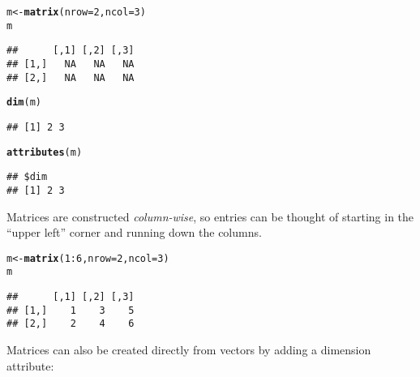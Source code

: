 \documentclass[10pt,a4paper,twoside]{article}\usepackage[]{graphicx}\usepackage[]{xcolor}
\makeatletter
\newcommand{\hlnum}[1]{\textcolor[rgb]{0.686,0.059,0.569}{#1}}%
\newcommand{\hlopt}[1]{\textcolor[rgb]{0,0,0}{#1}}%
\newcommand{\hldef}[1]{\textcolor[rgb]{0.345,0.345,0.345}{#1}}%
\newcommand{\hlkwb}[1]{\textcolor[rgb]{0.69,0.353,0.396}{#1}}%
\newcommand{\hlkwc}[1]{\textcolor[rgb]{0.333,0.667,0.333}{#1}}%
\newcommand{\hlkwd}[1]{\textcolor[rgb]{0.737,0.353,0.396}{\textbf{#1}}}%
\newenvironment{kframe}{%
 \def\at@end@of@kframe{}%
 \ifinner\ifhmode%
  \def\at@end@of@kframe{\end{minipage}}%
  \begin{minipage}{\columnwidth}%
 \fi\fi%
 \def\FrameCommand##1{\hskip\@totalleftmargin \hskip-\fboxsep
 \colorbox{shadecolor}{##1}\hskip-\fboxsep
     \hskip-\linewidth \hskip-\@totalleftmargin \hskip\columnwidth}%
 \MakeFramed {\advance\hsize-\width
   \@totalleftmargin\z@ \linewidth\hsize
   \@setminipage}}%
 {\par\unskip\endMakeFramed%
 \at@end@of@kframe}
\newenvironment{knitrout}{}{} %
\makeatother
\begin{document}
\begin{knitrout}
\color{fgcolor}\begin{kframe}
\begin{alltt}
\hldef{m} \hlkwb{<-} \hlkwd{matrix}\hldef{(}\hlkwc{nrow} \hldef{=} \hlnum{2}\hldef{,} \hlkwc{ncol} \hldef{=} \hlnum{3}\hldef{)}
\hldef{m}
\end{alltt}
\begin{verbatim}
##      [,1] [,2] [,3]
## [1,]   NA   NA   NA
## [2,]   NA   NA   NA
\end{verbatim}
\begin{alltt}
\hlkwd{dim}\hldef{(m)}
\end{alltt}
\begin{verbatim}
## [1] 2 3
\end{verbatim}
\begin{alltt}
\hlkwd{attributes}\hldef{(m)}
\end{alltt}
\begin{verbatim}
## $dim
## [1] 2 3
\end{verbatim}
\end{kframe}
\end{knitrout}

Matrices are constructed \emph{column-wise}, so entries can be thought of starting in the ``upper left'' corner and running down the columns.

\begin{knitrout}
\color{fgcolor}\begin{kframe}
\begin{alltt}
\hldef{m} \hlkwb{<-} \hlkwd{matrix}\hldef{(}\hlnum{1}\hlopt{:}\hlnum{6}\hldef{,} \hlkwc{nrow} \hldef{=} \hlnum{2}\hldef{,} \hlkwc{ncol} \hldef{=} \hlnum{3}\hldef{)}
\hldef{m}
\end{alltt}
\begin{verbatim}
##      [,1] [,2] [,3]
## [1,]    1    3    5
## [2,]    2    4    6
\end{verbatim}
\end{kframe}
\end{knitrout}

Matrices can also be created directly from vectors by adding a dimension attribute:
\end{document}
